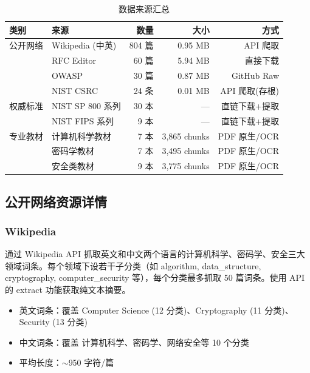 \documentclass[12pt,a4paper]{ctexart}
\begin{document}
\begin{table}[htbp]
\centering
\caption{数据来源汇总}
\label{tab:sources}
\begin{tabular}{@{}llrrr@{}}
\toprule
\textbf{类别} & \textbf{来源} & \textbf{数量} & \textbf{大小} & \textbf{方式} \\
\midrule
公开网络 & Wikipedia (中英) & 804 篇 & 0.95 MB & API 爬取 \\
         & RFC Editor       & 60 篇  & 5.94 MB & 直接下载 \\
         & OWASP            & 30 篇  & 0.87 MB & GitHub Raw \\
         & NIST CSRC        & 24 条  & 0.01 MB & API 爬取(存根) \\
\midrule
权威标准 & NIST SP 800 系列  & 30 本  & ---    & 直链下载+提取 \\
         & NIST FIPS 系列   & 9 本   & ---    & 直链下载+提取 \\
\midrule
专业教材 & 计算机科学教材   & 7 本   & 3,865 chunks & PDF 原生/OCR \\
         & 密码学教材       & 7 本   & 3,495 chunks & PDF 原生/OCR \\
         & 安全类教材       & 9 本   & 3,775 chunks & PDF 原生/OCR \\
\bottomrule
\end{tabular}
\end{table}

\subsection{公开网络资源详情}

\subsubsection*{Wikipedia}

通过 Wikipedia API 抓取英文和中文两个语言的计算机科学、密码学、安全三大领域词条。每个领域下设若干子分类（如 algorithm, data\_structure, cryptography, computer\_security 等），每个分类最多抓取 50 篇词条。使用 API 的 extract 功能获取纯文本摘要。

\begin{itemize}
    \item 英文词条：覆盖 Computer Science (12 分类)、Cryptography (11 分类)、Security (13 分类)
    \item 中文词条：覆盖 计算机科学、密码学、网络安全等 10 个分类
    \item 平均长度：$\sim$950 字符/篇
\end{itemize}
\end{document}
